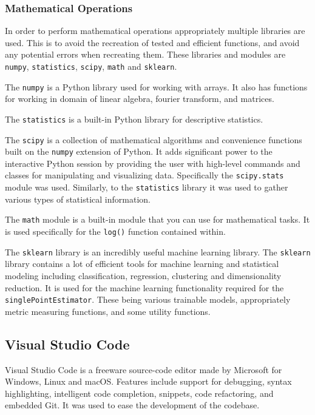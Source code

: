 \subsubsection{Mathematical Operations}

In order to perform mathematical operations appropriately multiple libraries are used. This is to avoid the recreation of tested and efficient functions, and avoid any potential errors when recreating them. These libraries and modules are \verb|numpy|, \verb|statistics|, \verb|scipy|, \verb|math| and \verb|sklearn|.

The \verb|numpy| is a Python library used for working with arrays. It also has functions for working in domain of linear algebra, fourier transform, and matrices.

The \verb|statistics| is a built-in Python library for descriptive statistics.

The \verb|scipy| is a collection of mathematical algorithms and convenience functions built on the \verb|numpy| extension of Python. It adds significant power to the interactive Python session by providing the user with high-level commands and classes for manipulating and visualizing data. Specifically the \verb|scipy.stats| module was used. Similarly, to the \verb|statistics| library it was used to gather various types of statistical information.

The \verb|math| module is a built-in module that you can use for mathematical tasks. It is used specifically for the \verb|log()| function contained within.

The \verb|sklearn| library is an incredibly useful machine learning library. The \verb|sklearn| library contains a lot of efficient tools for machine learning and statistical modeling including classification, regression, clustering and dimensionality reduction. It is used for the machine learning functionality required for the \verb|singlePointEstimator|. These being various trainable models, appropriately metric measuring functions, and some utility functions.

\subsection{Visual Studio Code}

Visual Studio Code is a freeware source-code editor made by Microsoft for Windows, Linux and macOS. Features include support for debugging, syntax highlighting, intelligent code completion, snippets, code refactoring, and embedded Git. It was used to ease the development of the codebase.

